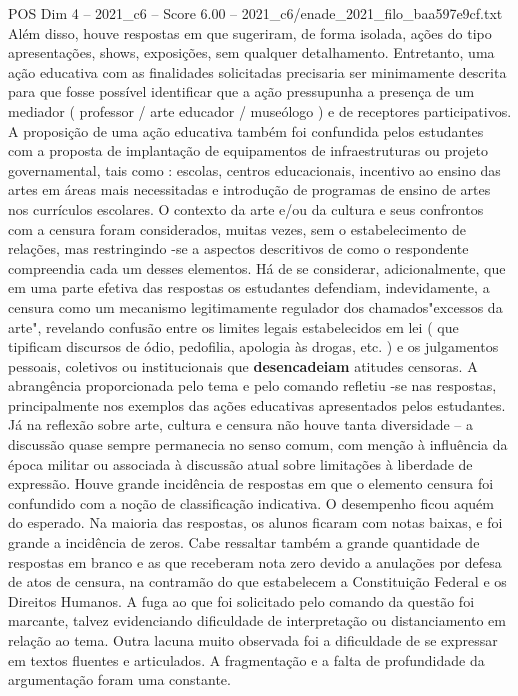\begin{textsample}{POS Dim 4 – 2021\_c6 – Score 6.00 – 2021\_c6/enade\_2021\_filo\_baa597e9cf.txt}
Além disso, houve respostas em que sugeriram, de forma isolada, ações do tipo apresentações, shows, exposições, sem qualquer detalhamento.
Entretanto, uma ação educativa com as finalidades solicitadas precisaria ser minimamente descrita para que fosse possível identificar que a ação pressupunha a presença de um mediador ( professor / arte educador / museólogo ) e de receptores participativos.
A proposição de uma ação educativa também foi confundida pelos estudantes com a proposta de implantação de equipamentos de infraestruturas ou projeto governamental, tais como : escolas, centros educacionais, incentivo ao ensino das artes em áreas mais necessitadas e introdução de programas de ensino de artes nos currículos escolares.
O contexto da arte e/ou da cultura e seus confrontos com a censura foram considerados, muitas vezes, sem o estabelecimento de relações, mas restringindo -se a aspectos descritivos de como o respondente compreendia cada um desses elementos.
Há de se considerar, adicionalmente, que em uma parte efetiva das respostas os estudantes defendiam, indevidamente, a censura como um mecanismo legitimamente regulador dos chamados"excessos da arte", revelando confusão entre os limites legais estabelecidos em lei ( que tipificam discursos de ódio, pedofilia, apologia às drogas, etc. ) e os julgamentos pessoais, coletivos ou institucionais que \textbf{desencadeiam} atitudes censoras.
A abrangência proporcionada pelo tema e pelo comando refletiu -se nas respostas, principalmente nos exemplos das ações educativas apresentados pelos estudantes.
Já na reflexão sobre arte, cultura e censura não houve tanta diversidade – a discussão quase sempre permanecia no senso comum, com menção à influência da época militar ou associada à discussão atual sobre limitações à liberdade de expressão.
Houve grande incidência de respostas em que o elemento censura foi confundido com a noção de classificação indicativa.
O desempenho ficou aquém do esperado.
Na maioria das respostas, os alunos ficaram com notas baixas, e foi grande a incidência de zeros.
Cabe ressaltar também a grande quantidade de respostas em branco e as que receberam nota zero devido a anulações por defesa de atos de censura, na contramão do que estabelecem a Constituição Federal e os Direitos Humanos.
A fuga ao que foi solicitado pelo comando da questão foi marcante, talvez evidenciando dificuldade de interpretação ou distanciamento em relação ao tema.
Outra lacuna muito observada foi a dificuldade de se expressar em textos fluentes e articulados.
A fragmentação e a falta de profundidade da argumentação foram uma constante.

\end{textsample}
